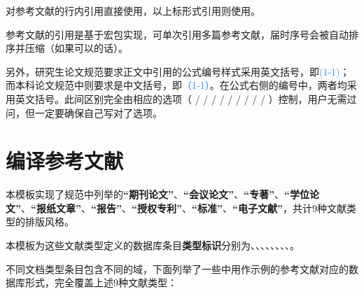 \documentclass[doctor, vlined, ]{DissertUESTC}
\begin{document}
	对参考文献的行内引用直接使用，以上标形式引用则使用。
	
	参考文献的引用是基于\href{https://mirrors.zju.edu.cn/CTAN/macros/latex/contrib/natbib/natbib.pdf}{\ttfamily\color{DarkRed}}宏包实现，可单次引用多篇参考文献，届时序号会被自动排序并压缩（如果可以的话）。

	另外，研究生论文规范要求正文中引用的公式编号样式采用英文括号，即\textcolor{DodgerBlue}{(1-1)}；而本科论文规范中则要求是中文括号，即\textcolor{DodgerBlue}{（1-1）}。在公式右侧的编号中，两者均采用英文括号。此间区别完全由相应的选项（ /  /  /  /  /  /  /  /  / ）控制，用户无需过问，但一定要确保自己写对了选项。
	
	
	\section{编译参考文献}
	
	本模板实现了规范中列举的\textbf{“期刊论文”}、\textbf{“会议论文”}、\textbf{“专著”}、\textbf{“学位论文”}、\textbf{“报纸文章”}、\textbf{“报告”}、\textbf{“授权专利”}、\textbf{“标准”}、\textbf{“电子文献”}，共计9种文献类型的排版风格。
	
	本模板为这些文献类型定义的数据库条目\textbf{类型标识}分别为、、、、、、、、。
	
	不同文档类型条目包含不同的域，下面列举了一些\href{https://gr.uestc.edu.cn/xiazai/114/3917}{\color{DarkRed}}中用作示例的参考文献对应的数据库形式，完全覆盖上述9种文献类型：
	
\end{document}
